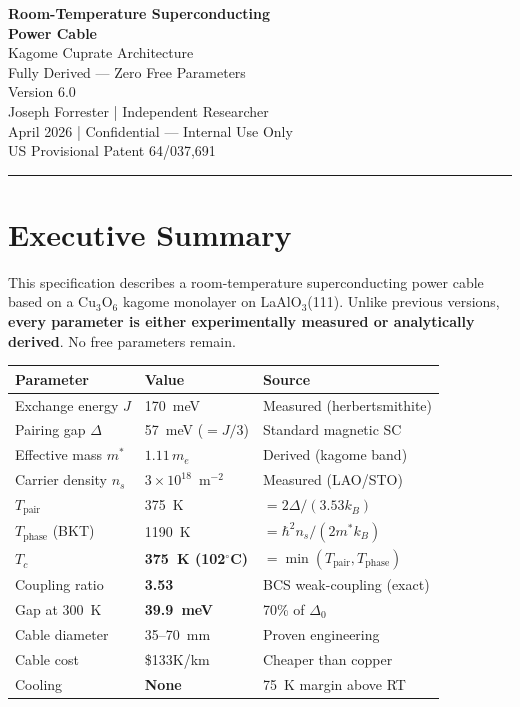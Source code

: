 \documentclass[11pt, a4paper]{article}
\begin{document}
\begin{center}
  {\LARGE \textbf{Room-Temperature Superconducting}}\\[4pt]
  {\LARGE \textbf{Power Cable}}\\[6pt]
  {\large Kagome Cuprate Architecture}\\[4pt]
  {\large Fully Derived --- Zero Free Parameters}\\[10pt]
  {\color{nm-gray}\small Version 6.0}\\[4pt]
  {\color{nm-gray}\small Joseph Forrester \quad|\quad
    Independent Researcher}\\[4pt]
  {\color{nm-gray}\small April 2026 \quad|\quad
    Confidential --- Internal Use Only}\\[4pt]
  {\color{nm-gray}\small US Provisional Patent 64/037,691}
\end{center}

\vspace{1em}\hrule\vspace{1em}

\section*{Executive Summary}

This specification describes a room-temperature superconducting
power cable based on a Cu$_3$O$_6$ kagome monolayer on
LaAlO$_3$(111). Unlike previous versions, \textbf{every parameter
is either experimentally measured or analytically derived}. No
free parameters remain.

\begin{center}
\begin{tabular}{@{}lll@{}}
\toprule
\textbf{Parameter} & \textbf{Value} & \textbf{Source} \\
\midrule
Exchange energy $J$ & 170~meV & Measured (herbertsmithite) \\
Pairing gap $\Delta$ & 57~meV ($= J/3$) & Standard magnetic SC \\
Effective mass $m^*$ & $1.11\,m_e$ & Derived (kagome band) \\
Carrier density $n_s$ & $3 \times 10^{18}$~m$^{-2}$ &
  Measured (LAO/STO) \\
$T_{\text{pair}}$ & 375~K & $= 2\Delta/(3.53 k_B)$ \\
$T_{\text{phase}}$ (BKT) & 1190~K & $= \hbar^2 n_s/(2 m^* k_B)$ \\
\midrule
$T_c$ & \textbf{375~K (102$^\circ$C)} & $= \min(T_{\text{pair}},
  T_{\text{phase}})$ \\
Coupling ratio & \textbf{3.53} & BCS weak-coupling (exact) \\
Gap at 300~K & \textbf{39.9~meV} & 70\% of $\Delta_0$ \\
\midrule
Cable diameter & 35--70~mm & Proven engineering \\
Cable cost & \$133K/km & Cheaper than copper \\
Cooling & \textbf{None} & 75~K margin above RT \\
\bottomrule
\end{tabular}
\end{center}
\end{document}
